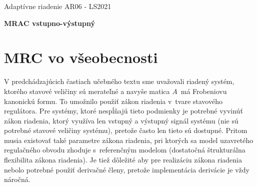 \documentclass[a4paper, 10pt, ]{article}
\def\oznacenieCasti{AR06 - LS2021}
\begin{document}
\lstset{%
style=mystyle,
rangebeginprefix=\#\#\#\ cellB\ ,%
rangebeginsuffix=\ \#\#\#,%
rangeendprefix=\#\#\#\ cellE\ ,%
rangeendsuffix=\ \#\#\#,%
includerangemarker=false,
}




\fontsize{12pt}{22pt}\selectfont

\centerline{\textsf{Adaptívne riadenie} \hfill \textsf{\oznacenieCasti}}

\fontsize{18pt}{22pt}\selectfont





\begin{flushleft}
    \textbf{\textsf{MRAC vstupno-výstupný}}
\end{flushleft}





\normalsize



{\hypersetup{hidelinks}

\tableofcontents

}

\bigskip

\vspace{18pt}






















\section{MRC vo všeobecnosti}






\lettrine[lines=3, nindent=0pt]{V}{} predchádzajúcich častiach učebného textu sme uvažovali riadený systém, ktorého stavové veličiny sú merateľné a navyše matica $A$~má Frobeniovu kanonickú formu. To umožnilo použiť zákon riadenia v~tvare stavového regulátora. Pre systémy, ktoré nespĺňajú tieto podmienky je potrebné vyvinúť zákon riadenia, ktorý využíva len vstupný a výstupný signál systému (nie sú potrebné stavové veličiny systému), pretože často len tieto sú dostupné. Pritom musia existovať také parametre zákona riadenia, pri ktorých sa model uzavretého regulačného obvodu zhoduje s~referenčným modelom (dostatočná štrukturálna flexibilita zákona riadenia). Je tiež dôležité aby pre realizáciu zákona riadenia nebolo potrebné použiť derivačné členy, pretože implementácia derivácie je vždy náročná.
\end{document}
